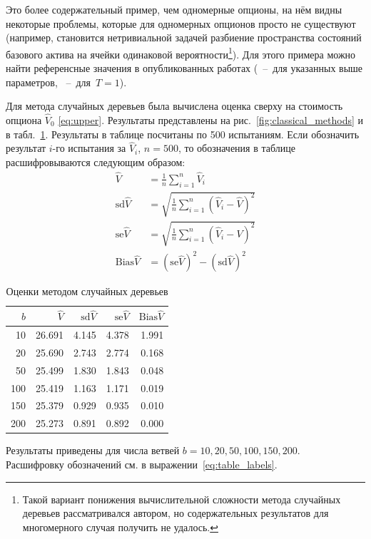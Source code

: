 \documentclass[specialist,
               substylefile = ../spbu.rtx,
               subf,href,colorlinks=true, 12pt]{disser}
\newcommand{\Vhat}{\hat{V}}
\begin{document}
Это более содержательный пример, чем одномерные опционы, на нём видны некоторые проблемы, которые для одномерных опционов просто не существуют (например, становится нетривиальной задачей разбиение пространства состояний базового актива на ячейки одинаковой вероятности\footnote{Такой вариант понижения вычислительной сложности метода случайных деревьев рассматривался автором, но содержательных результатов для многомерного случая получить не удалось.}). Для этого примера можно найти референсные значения в опубликованных работах (\cite[стр.~57]{Broadie2004}~--~для указанных выше параметров, \cite[табл.~5, стр.~1340]{Broadie1997}~--~для~$T=1$).

Для метода случайных деревьев была вычислена оценка сверху на стоимость опциона $\Vhat_0$ \eqref{eq:upper}. Результаты представлены на рис.~\ref{fig:classical_methods} и в табл.~\ref{tbl:random_tree_estimators}. Результаты в таблице посчитаны по 500 испытаниям. Если обозначить результат $i$-го испытания за $\Vhat_i$, $n=500$, то обозначения в таблице расшифровываются следующим образом:
\begin{equation}\label{eq:table_labels}
\begin{aligned}
\Vhat &= \frac{1}{n}\sum_{i=1}^n \Vhat_i \\
\mathrm{sd}\Vhat &= \sqrt{\frac{1}{n}\sum_{i=1}^n \left(\Vhat_i - \Vhat\right)^2} \\
\mathrm{se}\Vhat &= \sqrt{\frac{1}{n}\sum_{i=1}^n \left(\Vhat_i - V\right)^2} \\
\mathrm{Bias}\Vhat &= \left(\mathrm{se}\Vhat\right)^2 - \left(\mathrm{sd}\Vhat\right)^2
\end{aligned}
\end{equation}
\begin{table}
	\centering
	\caption{Оценки методом случайных деревьев}
	\begin{tabular}{rrrrr}
		$b$&$\Vhat$&$\mathrm{sd}\Vhat$&$\mathrm{se}\Vhat$&$\mathrm{Bias}\Vhat$\\\hline
		10&26.691&4.145&4.378&1.991\\
		20&25.690&2.743&2.774&0.168\\
		50&25.499&1.830&1.843&0.048\\
		100&25.419&1.163&1.171&0.019\\
		150&25.379&0.929&0.935&0.010\\
		200&25.273&0.891&0.892&0.000\\
	\end{tabular}
	\label{tbl:random_tree_estimators}

	\footnotesize
	Результаты приведены для числа ветвей $b = 10, 20, 50, 100, 150, 200$.\\\vspace{-0.3\baselineskip}Расшифровку обозначений см. в выражении~\eqref{eq:table_labels}.
\end{table}
\end{document}
